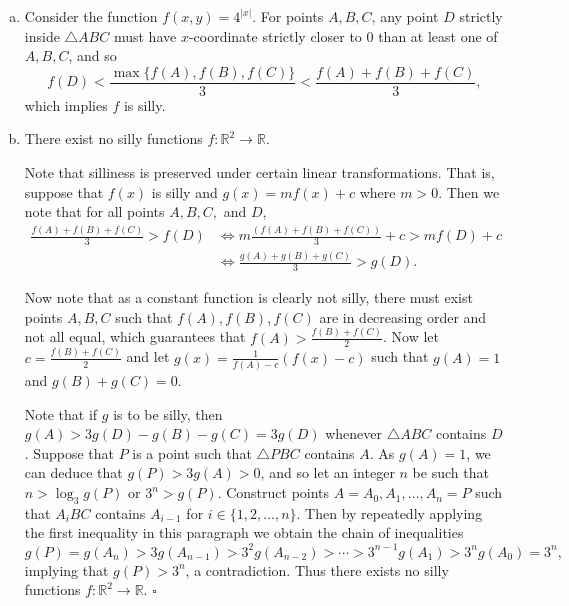 \documentclass[10pt]{article}
\begin{document}
	\begin{enumerate}[(a)]
	    \item Consider the function \(f(x,y) = 4^{\lvert x \rvert}\). For points $A,B,C$, any point $D$ strictly inside $\triangle ABC$ must have $x$-coordinate strictly closer to $0$ than at least one of $A,B,C$, and so \[f(D) < \frac{\max \{f(A),f(B),f(C)\}}{3} < \frac{f(A)+f(B)+f(C)}{3},\] which implies $f$ is silly.
	    
	    \item There exist no silly functions \(f : \mathbb{R}^2 \rightarrow \mathbb{R}\).
	    
	    Note that silliness is preserved under certain linear transformations. That is, suppose that \(f(x)\) is silly and \(g(x) = mf(x) + c\) where \(m > 0\). Then we note that for all points \(A, B, C,\) and \(D\),
	    \begin{align*}
	    \frac{f(A)+f(B)+f(C)}{3}>f(D) &\iff m\frac{(f(A)+f(B)+f(C))}{3}+c>mf(D)+c\\
	    &\iff \frac{g(A)+g(B)+g(C)}{3} > g(D).
	    \end{align*}
	    
	    \makebox[15pt]{}Now note that as a constant function is clearly not silly, there must exist points \(A, B, C\) such that \(f(A), f(B), f(C)\) are in decreasing order and not all equal, which guarantees that \(f(A) > \frac{f(B)+f(C)}{2}\). Now let \(c=\frac{f(B)+f(C)}{2}\) and let \(g(x) = \frac{1}{f(A)-c}(f(x) - c)\) such that \(g(A) = 1\) and \(g(B)+g(C) = 0.\)
	    
	    \makebox[15pt]{}Note that if \(g\) is to be silly, then \(g(A) > 3g(D) - g(B) - g(C) = 3g(D)\) whenever \(\triangle ABC\) contains \(D\). Suppose that \(P\) is a point such that \(\triangle PBC\) contains \(A\). As \(g(A) = 1\), we can deduce that \(g(P) > 3g(A) > 0\), and so let an integer \(n\) be such that \(n > \log_3 g(P)\) or \(3^n > g(P)\). Construct points \(A = A_0, A_1, \dots, A_n = P\) such that \(A_iBC\) contains \(A_{i-1}\) for \(i \in \{1, 2, \dots, n\}\). Then by repeatedly applying the first inequality in this paragraph we obtain the chain of inequalities
	    \[g(P) = g(A_n)>3g(A_{n-1}) > 3^2g(A_{n-2}) > \cdots > 3^{n-1}g(A_1) > 3^ng(A_0) = 3^n,\] implying that \(g(P) > 3^n\), a contradiction. Thus there exists no silly functions \(f: \mathbb{R}^2 \rightarrow \mathbb{R}\). \hfill\ensuremath{\square}\\
	\end{enumerate}
	
\end{document}
